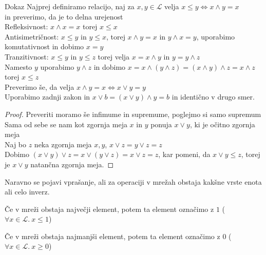 \documentclass[slovene]{beamer}
\begin{document}
\begin{frame}

\begin{block}{Dokaz}
Najprej definiramo relacijo, naj za $x,y \in \mathcal{L}$ velja $x \leq y \iff x \land y = x$\\ in preverimo, da je to delna urejenost \\ \pause
Refleksivnost: \pause$x \land x = x$ torej $x \leq x$\\ \pause
Antisimetričnost: \pause $x \leq y$ in $y \leq x$, torej $x \land y = x$ in $y \land x = y$, uporabimo komutativnost in dobimo $x = y$\\ \pause
Tranzitivnost: \pause $x \leq y$ in $y \leq z$ torej velja $x = x \land y$ in $y = y \land z$ \\ \pause
Namesto $y$ uporabimo $y \land z$ in dobimo $x = x \land (y \land z) = (x \land y) \land z = x \land z$ torej \pause $x \leq z$ \\ \pause
Preverimo še, da velja $x \land y = x \iff x \lor y = y$\\ \pause
Uporabimo zadnji zakon in $x \lor b = (x \lor y) \land y = b$ in identično v drugo smer.

\end{block}

\end{frame}


\begin{frame}
\begin{proof}
Preveriti moramo še infimume in supremume\pause, poglejmo si samo supremum\\ \pause
Sama od sebe se nam kot zgornja meja $x$ in $y$ ponuja $x \lor y$, ki je očitno zgornja meja \\ \pause%
Naj bo $z$ neka zgornja meja $x,y$, $x \lor z = y \lor z = z$\\ \pause
Dobimo $(x \lor y) \lor z = x \lor (y \lor z) = x \lor z = z$, kar pomeni, da $x \lor y \leq z$, torej je $x \lor y$ natančna zgornja meja. 
\end{proof}
\end{frame}

\begin{frame}

\begin{block}{}
Naravno se pojavi vprašanje, ali za operaciji v mrežah obstaja kakšne vrste enota ali celo inverz.
\end{block}

\begin{definition}
Če v mreži obstaja največji element, potem ta element označimo z $1$ ($\forall x \in \mathcal{L}. \ x \leq 1$)
\end{definition}

\begin{definition}
Če v mreži obstaja najmanjši element, potem ta element označimo z $0$ ($\forall x \in \mathcal{L}. \ x \geq 0$)
\end{definition}

\end{frame}
\end{document}
